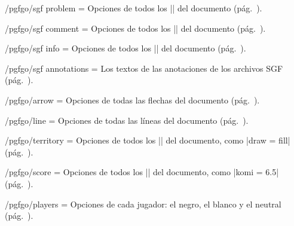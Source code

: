 \begin{key}{/pgfgo/sgf problem = }
	Opciones de todos los |\sgfproblem| del documento (pág.~\pageref{subsec:sgfproblemas}).
\end{key}

\begin{key}{/pgfgo/sgf comment = }
	Opciones de todos los |\sgfcomment| del documento (pág.~\pageref{subsec:sgfdatos}).
\end{key}

\begin{key}{/pgfgo/sgf info = }
	Opciones de todos los |\sgfinfo| del documento (pág.~\pageref{subsec:sgfdatos}).
\end{key}

\begin{key}{/pgfgo/sgf annotations = }
	Los textos de las anotaciones de los archivos SGF (pág.~\pageref{subsec:sgfdatos}).
\end{key}

\begin{key}{/pgfgo/arrow = }
	Opciones de todas las flechas del documento (pág.~\pageref{subsec:flechas}).
\end{key}

\begin{key}{/pgfgo/line = }
	Opciones de todas las líneas del documento (pág.~\pageref{subsec:flechas}).
\end{key}

\begin{key}{/pgfgo/territory = }
	Opciones de todos los |\territory| del documento, como |draw = fill| (pág.~\pageref{subsec:territorio}).
\end{key}

\begin{key}{/pgfgo/score = }
	Opciones de todos los |\pgfgoscore| del documento, como |komi = 6.5| (pág.~\pageref{subsec:territorio}).
\end{key}

\begin{key}{/pgfgo/players = }
	Opciones de cada jugador: el negro, el blanco y el neutral (pág.~\pageref{sec:jugadores}).
\end{key}

\begin{codeexample}[]
	
	\begin{goban}[3]
	\end{goban}
	
	\begin{goban}[4]
	\end{goban}
\end{codeexample}

